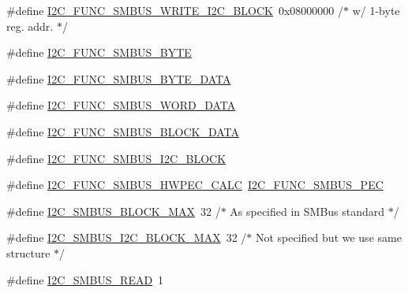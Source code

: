 \begin{DoxyCompactItemize}
\item 
\#define \hyperlink{i2c-tools-3_81_81_2include_2linux_2i2c-dev_8h_a87990a457cb6785821f82eddd5bda85e}{I2\+C\+\_\+\+F\+U\+N\+C\+\_\+\+S\+M\+B\+U\+S\+\_\+\+W\+R\+I\+T\+E\+\_\+\+I2\+C\+\_\+\+B\+L\+O\+C\+K}~0x08000000 /$\ast$ w/ 1-\/byte reg. addr. $\ast$/
\item 
\#define \hyperlink{i2c-tools-3_81_81_2include_2linux_2i2c-dev_8h_a0e940355fb6532a740e57aece17c670c}{I2\+C\+\_\+\+F\+U\+N\+C\+\_\+\+S\+M\+B\+U\+S\+\_\+\+B\+Y\+T\+E}
\item 
\#define \hyperlink{i2c-tools-3_81_81_2include_2linux_2i2c-dev_8h_a3d09bc1b4dfbf7336abf83e477419b90}{I2\+C\+\_\+\+F\+U\+N\+C\+\_\+\+S\+M\+B\+U\+S\+\_\+\+B\+Y\+T\+E\+\_\+\+D\+A\+T\+A}
\item 
\#define \hyperlink{i2c-tools-3_81_81_2include_2linux_2i2c-dev_8h_a1448936de71a0846193adbde34900948}{I2\+C\+\_\+\+F\+U\+N\+C\+\_\+\+S\+M\+B\+U\+S\+\_\+\+W\+O\+R\+D\+\_\+\+D\+A\+T\+A}
\item 
\#define \hyperlink{i2c-tools-3_81_81_2include_2linux_2i2c-dev_8h_aef52b94d71c11d2849c6f3ae62d0e29b}{I2\+C\+\_\+\+F\+U\+N\+C\+\_\+\+S\+M\+B\+U\+S\+\_\+\+B\+L\+O\+C\+K\+\_\+\+D\+A\+T\+A}
\item 
\#define \hyperlink{i2c-tools-3_81_81_2include_2linux_2i2c-dev_8h_ad94ca1f256004b790c2feb762ff963e7}{I2\+C\+\_\+\+F\+U\+N\+C\+\_\+\+S\+M\+B\+U\+S\+\_\+\+I2\+C\+\_\+\+B\+L\+O\+C\+K}
\item 
\#define \hyperlink{i2c-tools-3_81_81_2include_2linux_2i2c-dev_8h_a21b4983c1a932e11d566a9e11734e4a8}{I2\+C\+\_\+\+F\+U\+N\+C\+\_\+\+S\+M\+B\+U\+S\+\_\+\+H\+W\+P\+E\+C\+\_\+\+C\+A\+L\+C}~\hyperlink{smbus-cffi-0_83_82_2include_2linux_2i2c-dev_8h_aef3b905e021dbe7aaf98da89c4648764}{I2\+C\+\_\+\+F\+U\+N\+C\+\_\+\+S\+M\+B\+U\+S\+\_\+\+P\+E\+C}
\item 
\#define \hyperlink{i2c-tools-3_81_81_2include_2linux_2i2c-dev_8h_ac2dd8b77e329bba4a3ca9cd275f9bf50}{I2\+C\+\_\+\+S\+M\+B\+U\+S\+\_\+\+B\+L\+O\+C\+K\+\_\+\+M\+A\+X}~32	/$\ast$ As specified in S\+M\+Bus standard $\ast$/
\item 
\#define \hyperlink{i2c-tools-3_81_81_2include_2linux_2i2c-dev_8h_a13045bd7a62d8d55acbcf174b7149cbf}{I2\+C\+\_\+\+S\+M\+B\+U\+S\+\_\+\+I2\+C\+\_\+\+B\+L\+O\+C\+K\+\_\+\+M\+A\+X}~32	/$\ast$ Not specified but we use same structure $\ast$/
\item 
\#define \hyperlink{i2c-tools-3_81_81_2include_2linux_2i2c-dev_8h_a8f5482668eb7741ef21dd9c211d876c9}{I2\+C\+\_\+\+S\+M\+B\+U\+S\+\_\+\+R\+E\+A\+D}~1
\item 

\end{DoxyCompactItemize}
